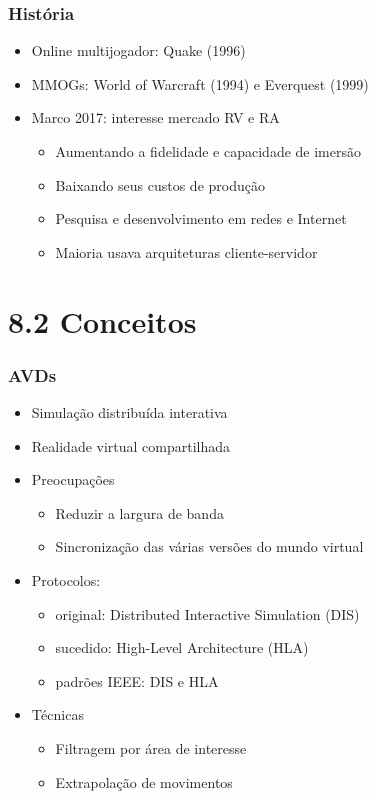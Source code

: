 \documentclass{beamer}
\begin{document}
\begin{frame}
  \frametitle{História}
    \begin{itemize}
      \item Online multijogador: Quake (1996)
      \item MMOGs: World of Warcraft (1994) e Everquest (1999)
      \item Marco 2017: interesse mercado RV e RA
      \begin{itemize}
        \item Aumentando a fidelidade e capacidade de imersão
        \item Baixando seus custos de produção
        \item Pesquisa e desenvolvimento em redes e Internet
        \item Maioria usava arquiteturas cliente-servidor
      \end{itemize}
    \end{itemize}
  \end{frame}
  
  \section{8.2 Conceitos}
  \begin{frame}
    \frametitle{AVDs}
    \begin{itemize}
      \item Simulação distribuída interativa
      \item Realidade virtual compartilhada
      \item Preocupações
      \begin{itemize}
        \item Reduzir a largura de banda
        \item Sincronização das várias versões do mundo virtual
      \end{itemize}
      \item Protocolos:
      \begin{itemize}
        \item original: Distributed Interactive Simulation (DIS)
        \item sucedido: High-Level Architecture (HLA)
        \item padrões IEEE: DIS e HLA
      \end{itemize}
      \item Técnicas
      \begin{itemize}
        \item Filtragem por área de interesse
        \item Extrapolação de movimentos
      \end{itemize}
    \end{itemize}
\end{frame}
\end{document}
